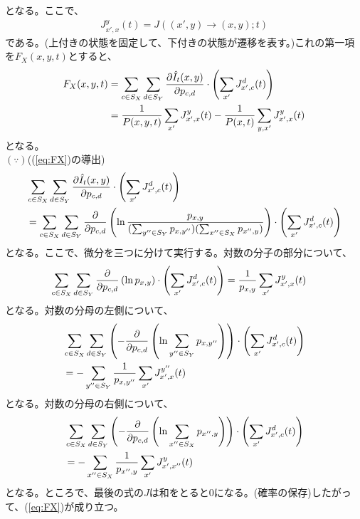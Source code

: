 \documentclass[a4paper,11pt]{jsarticle}
\numberwithin{equation}{section}
\begin{document}
となる。ここで、
\begin{align}
    J_{x',x}^y(t) = J((x',y) \to (x,y); t) 
\end{align}
である。(上付きの状態を固定して、下付きの状態が遷移を表す。)これの第一項を$F_X(x,y,t)$とすると、
\begin{align}
    F_X(x,y,t) &= \sum_{c \in S_X} \sum_{d \in S_Y} \pdv{\hat{I}_t(x,y)}{p_{c,d}} \cdot \left( \sum_{x'} J_{x' ,c}^d(t) \right) \\
    &= \frac{1}{P(x,y,t)} \sum_{x'} J_{x',x}^y(t) - \frac{1}{P(x,t)} \sum_{y,x'} J_{x',x}^y(t) \label{eq:FX}
\end{align}
となる。\\
$(\because)$((\ref{eq:FX})の導出)\\
\begin{align}
    &\sum_{c\in S_X} \sum_{d \in S_Y} \pdv{\hat{I}_t(x,y)}{p_{c,d}} \cdot \left( \sum_{x'} J_{x' ,c}^d(t) \right)\\
    &= \sum_{c\in S_X} \sum_{d \in S_Y} \pdv{p_{c,d}}\left( \ln \frac{p_{x,y}}{(\sum_{y'' \in S_Y} p_{x,y''})(\sum_{x'' \in S_X} p_{x'',y})} \right) \cdot \left( \sum_{x'} J_{x' ,c}^d(t) \right)
\end{align}
となる。ここで、微分を三つに分けて実行する。対数の分子の部分について、
\begin{align}
    \sum_{c\in S_X} \sum_{d \in S_Y} \pdv{p_{c,d}}\left( \ln p_{x,y} \right) \cdot \left( \sum_{x'} J_{x' ,c}^d(t) \right) &= \frac{1}{p_{x,y}} \sum_{x'} J_{x' ,x}^y(t)
\end{align}
となる。対数の分母の左側について、
\begin{align}
    &\sum_{c\in S_X} \sum_{d \in S_Y} \left(-\pdv{p_{c,d}}\left( \ln \sum_{y'' \in S_Y} p_{x,y''} \right) \right) \cdot \left( \sum_{x'} J_{x' ,c}^d(t) \right) \\
    &= -\sum_{y'' \in S_Y} \frac{1}{p_{x,y''}} \sum_{x'} J_{x' ,x}^{y''}(t)
\end{align}
となる。対数の分母の右側について、
\begin{align}
    &\sum_{c\in S_X} \sum_{d \in S_Y} \left(-\pdv{p_{c,d}}\left( \ln \sum_{x'' \in S_X} p_{x'',y} \right) \right) \cdot \left( \sum_{x'} J_{x' ,c}^d(t) \right) \\
    &= -\sum_{x'' \in S_X} \frac{1}{p_{x'',y}} \sum_{x'} J_{x' ,x''}^{y}(t)
\end{align}
となる。ところで、最後の式の$J$は和をとると$0$になる。(確率の保存)したがって、(\ref{eq:FX})が成り立つ。\hfill\qedsymbol\\
\end{document}
